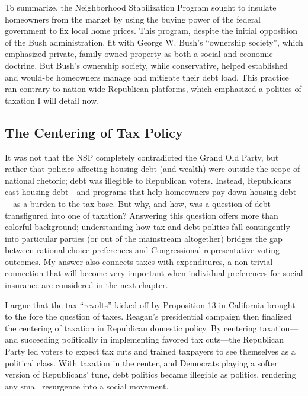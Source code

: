 \documentclass[12pt,oneside]{psthesis}
\begin{document}
To summarize, the Neighborhood Stabilization Program sought to insulate homeowners from the market by using the buying power of the federal government to fix local home prices.
This program, despite the initial opposition of the Bush administration, fit with George W. Bush's ``ownership society'', which emphasized private, family-owned property as both a social and economic doctrine.
But Bush's ownership society, while conservative, helped established and would-be homeowners manage and mitigate their debt load.
This practice ran contrary to nation-wide Republican platforms, which emphasized a politics of taxation I will detail now.

\hypertarget{the-centering-of-tax-policy}{%
\subsection{The Centering of Tax Policy}\label{the-centering-of-tax-policy}}

It was not that the NSP completely contradicted the Grand Old Party, but rather that policies affecting housing debt (and wealth) were outside the scope of national rhetoric; debt was illegible to Republican voters.
Instead, Republicans cast housing debt---and programs that help homeowners pay down housing debt---as a burden to the tax base.
But why, and how, was a question of debt transfigured into one of taxation?
Answering this question offers more than colorful background; understanding how tax and debt politics fall contingently into particular parties (or out of the mainstream altogether) bridges the gap between rational choice preferences and Congressional representative voting outcomes.
My answer also connects taxes with expenditures, a non-trivial connection that will become very important when individual preferences for social insurance are considered in the next chapter.

I argue that the tax ``revolts'' kicked off by Proposition 13 in California brought to the fore the question of taxes.
Reagan's presidential campaign then finalized the centering of taxation in Republican domestic policy.
By centering taxation---and succeeding politically in implementing favored tax cuts---the Republican Party led voters to expect tax cuts and trained taxpayers to see themselves as a political class.
With taxation in the center, and Democrats playing a softer version of Republicans' tune, debt politics became illegible as politics, rendering any small resurgence into a social movement.
\end{document}
